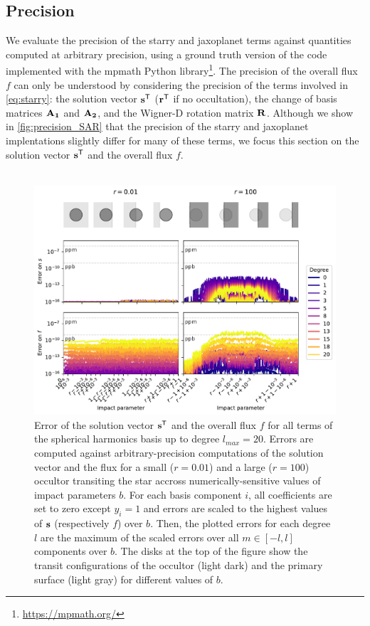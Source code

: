 \documentclass[modern]{aastex631}
\begin{document}
\subsection{Precision}\label{precision}
We evaluate the precision of the \textsf{starry} and \textsf{jaxoplanet} terms against quantities computed at arbitrary precision, using a ground truth version of the code implemented with the \textsf{mpmath} Python library\footnote{\href{https://mpmath.org/}{https://mpmath.org/}}. The precision of the overall flux $f$ can only be understood by considering the precision of the terms involved in \autoref{eq:starry}: the solution vector ${\mathbf{s}}^\mathsf{T}$ (${\mathbf{r}}^\mathsf{T}$ if no occultation), the change of basis matrices ${\mathbf{A_1}}$ and ${\mathbf{A_2}}$, and the Wigner-D rotation matrix ${\mathbf{R}}$. Although we show in \autoref{fig:precision_SAR} that the precision of the \textsf{starry} and \textsf{jaxoplanet} implentations slightly differ for many of these terms, we focus this section on the solution vector ${\mathbf{s}}^\mathsf{T}$ and the overall flux $f$.\\\\
\begin{figure}[H]
    \begin{center}
        \includegraphics[width=\textwidth]{../workflows/figures/error_jax.pdf}
        \caption{Error of the solution vector ${\mathbf{s}}^\mathsf{T}$ and the overall flux $f$ for all terms of the spherical harmonics basis up to degree $l_{max}=20$. Errors are computed against arbitrary-precision computations of the solution vector and the flux for a small ($r=0.01$) and a large ($r=100$) occultor transiting the star accross numerically-sensitive values of impact parameters $b$. For each basis component $i$, all coefficients are set to zero except $y_i=1$ and errors are scaled to the highest values of ${\mathbf{s}}$ (respectively $f$) over $b$. Then, the plotted errors for each degree $l$ are the maximum of the scaled errors over all $m\in [-l, l]$ components over $b$. The disks at the top of the figure show the transit configurations of the occultor (light dark) and the primary surface (light gray) for different values of $b$. }
        \label{fig:precision_s}
    \end{center}
\end{figure}
\end{document}
